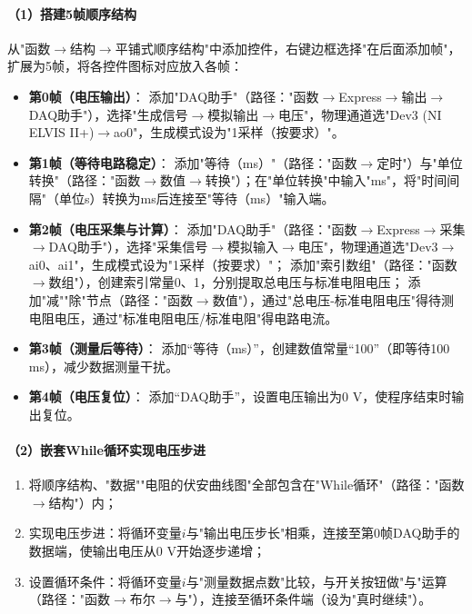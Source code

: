 \documentclass[11pt]{article}
\begin{document}
\paragraph{（1）搭建5帧顺序结构}
从"函数$\rightarrow$结构$\rightarrow$平铺式顺序结构"中添加控件，右键边框选择"在后面添加帧"，扩展为5帧，将各控件图标对应放入各帧：
\begin{itemize}
    \item \textbf{第0帧（电压输出）}：
          添加"DAQ助手"（路径："函数$\rightarrow$Express$\rightarrow$输出$\rightarrow$DAQ助手"），选择"生成信号$\rightarrow$模拟输出$\rightarrow$电压"，物理通道选"Dev3 (NI ELVIS II+)$\rightarrow$ao0"，生成模式设为"1采样（按要求）"。
    \item \textbf{第1帧（等待电路稳定）}：
          添加"等待（ms）"（路径："函数$\rightarrow$定时"）与"单位转换"（路径："函数$\rightarrow$数值$\rightarrow$转换"）；在"单位转换"中输入"ms"，将"时间间隔"（单位s）转换为ms后连接至"等待（ms）"输入端。
    \item \textbf{第2帧（电压采集与计算）}：
          添加"DAQ助手"（路径："函数$\rightarrow$Express$\rightarrow$采集$\rightarrow$DAQ助手"），选择"采集信号$\rightarrow$模拟输入$\rightarrow$电压"，物理通道选"Dev3$\rightarrow$ai0、ai1"，生成模式设为"1采样（按要求）"；
          添加"索引数组"（路径："函数$\rightarrow$数组"），创建索引常量0、1，分别提取总电压与标准电阻电压；
          添加"减""除"节点（路径："函数$\rightarrow$数值"），通过"总电压-标准电阻电压"得待测电阻电压，通过"标准电阻电压/标准电阻"得电路电流。
    \item \textbf{第3帧（测量后等待）}：
          添加“等待（ms）”，创建数值常量“100”（即等待100 ms），减少数据测量干扰。
    \item \textbf{第4帧（电压复位）}：
          添加“DAQ助手”，设置电压输出为0 V，使程序结束时输出复位。
\end{itemize}

\paragraph{（2）嵌套While循环实现电压步进}
\begin{enumerate}
    \item 将顺序结构、"数据""电阻的伏安曲线图"全部包含在"While循环"（路径："函数$\rightarrow$结构"）内；
    \item 实现电压步进：将循环变量$i$与"输出电压步长"相乘，连接至第0帧DAQ助手的数据端，使输出电压从0 V开始逐步递增；
    \item 设置循环条件：将循环变量$i$与"测量数据点数"比较，与开关按钮做"与"运算（路径："函数$\rightarrow$布尔$\rightarrow$与"），连接至循环条件端（设为"真时继续"）。
\end{enumerate}
\end{document}
